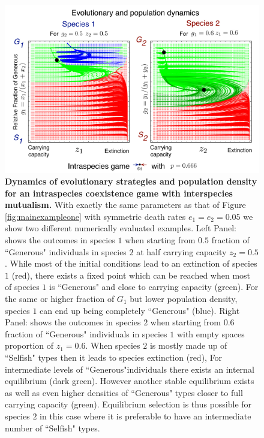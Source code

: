 \documentclass[12pt]{article}
\begin{document}
\begin{figure}
\begin{center}
\includegraphics[width=\columnwidth]{Figures/mainexamplepopdyn2.pdf}
\caption{\small{
\textbf{Dynamics of evolutionary strategies and population density for an intraspecies coexistence game with interspecies mutualism.}
With exactly the same parameters as that of Figure \ref{fig:mainexampleone} with  symmetric death rates $e_1 = e_2 = 0.05$ we show two different numerically evaluated examples.
Left Panel: shows the outcomes in species $1$ when starting from $0.5$ fraction of ``Generous" individuals in species $2$ at half carrying capacity $z_2 = 0.5$.
While most of the initial conditions lead to an extinction of species $1$ (red), there exists a fixed point which can be reached when most of species $1$ is ``Generous" and close to carrying capacity (green). For the same or higher fraction of $G_1$ but lower population density, species $1$ can end up being completely ``Generous" (blue).
Right Panel: shows the outcomes in species $2$ when starting from $0.6$ fraction of ``Generous" individuals in species $1$ with empty spaces proportion of $z_1 = 0.6$.
When species $2$ is mostly made up of ``Selfish" types then it leads to species extinction (red), For intermediate levels of ``Generous"individuals there exists an internal equilibrium (dark green). However another stable equilibrium exists as well as even higher densities of ``Generous" types closer to full carrying capacity (green).
Equilibrium selection is thus possible for species $2$ in this case where it is preferable to have an intermediate number of ``Selfish" types.
\label{fig:popdyn}
}
}
\end{center}
\end{figure}
\end{document}
